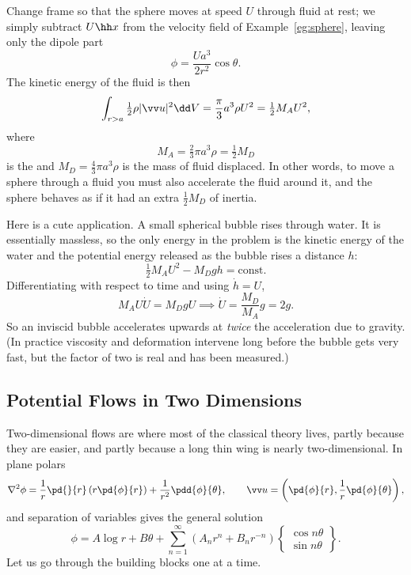 \begin{example}
	Change frame so that the sphere moves at speed $U$ through fluid at rest; we simply subtract $U\hh x$ from the velocity field of Example~\ref{eg:sphere}, leaving only the dipole part
	$$
	\phi = \frac{Ua^3}{2r^2}\cos\theta.
	$$
	The kinetic energy of the fluid is then
	$$
	\int_{r>a} \tfrac{1}{2}\rho|\vv u|^2 \dd V = \frac{\pi}{3}a^3 \rho U^2 = \tfrac{1}{2}M_A U^2,
	$$
	where
	$$
	M_A = \tfrac{2}{3}\pi a^3 \rho = \tfrac{1}{2}M_D
	$$
	is the  and $M_D = \tfrac{4}{3}\pi a^3\rho$ is the mass of fluid displaced. In other words, to move a sphere through a fluid you must also accelerate the fluid around it, and the sphere behaves as if it had an extra $\tfrac{1}{2}M_D$ of inertia.

	Here is a cute application. A small spherical bubble rises through water. It is essentially massless, so the only energy in the problem is the kinetic energy of the water and the potential energy released as the bubble rises a distance $h$:
	$$
	\tfrac{1}{2}M_A U^2 - M_D g h = \text{const}.
	$$
	Differentiating with respect to time and using $\dot h = U$,
	$$
	M_A U \dot U = M_D g U \implies \dot U = \frac{M_D}{M_A}g = 2g.
	$$
	So an inviscid bubble accelerates upwards at \emph{twice} the acceleration due to gravity. (In practice viscosity and deformation intervene long before the bubble gets very fast, but the factor of two is real and has been measured.)
\end{example}

\subsection{Potential Flows in Two Dimensions}

Two-dimensional flows are where most of the classical theory lives, partly because they are easier, and partly because a long thin wing is nearly two-dimensional. In plane polars
$$
\nabla^2 \phi = \frac{1}{r}\pd{}{r}\left(r \pd{\phi}{r}\right) + \frac{1}{r^2}\pdd{\phi}{\theta}, \qquad \vv u = \left(\pd{\phi}{r}, \frac{1}{r}\pd{\phi}{\theta}\right),
$$
and separation of variables gives the general solution
$$
\phi = A\log r + B\theta + \sum_{n=1}^\infty \left(A_n r^n + B_n r^{-n}\right)\left\{\begin{matrix}\cos n\theta \\ \sin n\theta\end{matrix}\right\}.
$$
Let us go through the building blocks one at a time.

